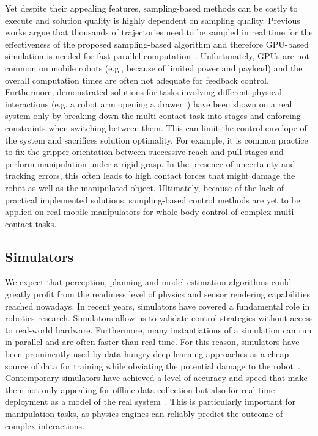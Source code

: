 Yet despite their appealing features, sampling-based methods can be costly to execute and solution quality is highly dependent on sampling quality. Previous works argue that thousands of trajectories need to be sampled in real time for the effectiveness of the proposed sampling-based algorithm and therefore GPU-based simulation is needed for fast parallel computation~\cite{williams_model_2017}. Unfortunately, GPUs are not common on mobile robots (e.g., because of limited power and payload) and the overall computation times are often not adequate for feedback control. 
Furthermore, demonstrated solutions for tasks involving different physical interactions (e.g. a robot arm opening a drawer~\cite{abraham_model-based_2020}) have been shown on a real system only by breaking down the multi-contact task into stages and enforcing constraints when switching between them. 
This can limit the control envelope of the system and sacrifices solution optimality. For example, it is common practice to fix the gripper orientation between successive reach and pull stages and perform manipulation under a rigid grasp. In the presence of uncertainty and tracking errors, this often leads to high contact forces that might damage the robot as well as the manipulated object.
Ultimately, because of the lack of practical implemented solutions, sampling-based control methods are yet to be applied on real mobile manipulators for whole-body control of complex multi-contact tasks.   


\subsection{Simulators}
We expect that perception, planning and model estimation algorithms could greatly profit from the readiness level of physics and sensor rendering capabilities reached nowadays.  
In recent years, simulators have covered a fundamental role in robotics research. Simulators allow us to validate control strategies without access to real-world hardware. Furthermore, many instantiations of a simulation can run in parallel and are often faster than real-time.  For this reason, simulators have been prominently used by data-hungry deep learning approaches as a cheap source of data for training while obviating the potential damage to the robot~\cite{liang_gpu-accelerated_2018}.
Contemporary simulators have achieved a level of accuracy and speed that make them not only appealing for offline data collection but also for real-time deployment as a model of the real system~\cite{sim-benchmarks}. This is particularly important for manipulation tasks, as physics engines can reliably predict the outcome of complex interactions.  

